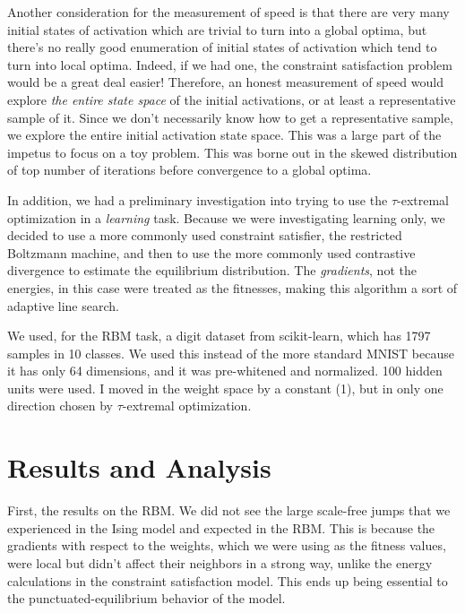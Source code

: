 \documentclass[12pt]{article}
\begin{document}
Another consideration for the measurement of speed is that there are very many initial states of activation which are trivial to turn into a global optima, but there's no really good enumeration of initial states of activation which tend to turn into local optima. Indeed, if we had one, the constraint satisfaction problem would be a great deal easier! Therefore, an honest measurement of speed would explore \emph{the entire state space} of the initial activations, or at least a representative sample of it. Since we don't necessarily know how to get a representative sample, we explore the entire initial activation state space. This was a large part of the impetus to focus on a toy problem. This was borne out in the skewed distribution of top number of iterations before convergence to a global optima.

In addition, we had a preliminary investigation into trying to use the $\tau$-extremal optimization in a \emph{learning} task. Because we were investigating learning only, we decided to use a more commonly used constraint satisfier, the restricted Boltzmann machine\cite{rbm}, and then to use the more commonly used contrastive divergence to estimate the equilibrium distribution. The \emph{gradients}, not the energies, in this case were treated as the fitnesses, making this algorithm a sort of adaptive line search.

We used, for the RBM task, a digit dataset from scikit-learn\cite{scikitlearn}, which has 1797 samples in 10 classes. We used this instead of the more standard MNIST because it has only 64 dimensions, and it was pre-whitened and normalized. 100 hidden units were used. I moved in the weight space by a constant (1), but in only one direction chosen by $\tau$-extremal optimization.

\section{Results and Analysis}
First, the results on the RBM. We did not see the large scale-free jumps that we experienced in the Ising model and expected in the RBM. This is because the gradients with respect to the weights, which we were using as the fitness values, were local but didn't affect their neighbors in a strong way, unlike the energy calculations in the constraint satisfaction model. This ends up being essential to the punctuated-equilibrium behavior of the model.
\end{document}
